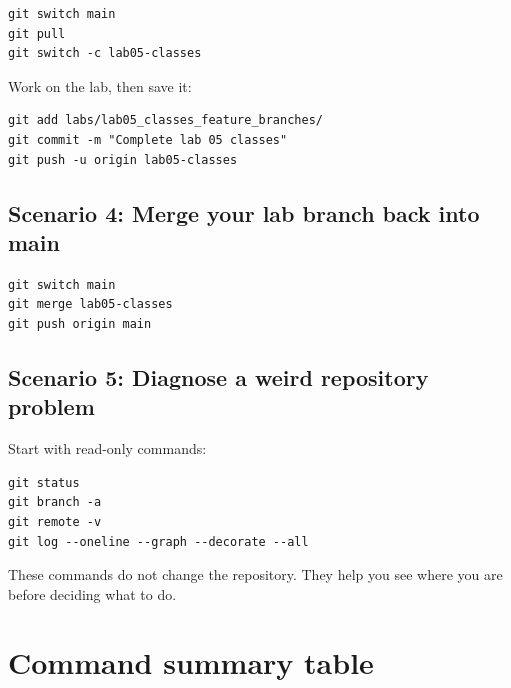 \documentclass[11pt]{article}
\begin{document}
\begin{lstlisting}[style=terminal]
git switch main
git pull
git switch -c lab05-classes
\end{lstlisting}

Work on the lab, then save it:

\begin{lstlisting}[style=terminal]
git add labs/lab05_classes_feature_branches/
git commit -m "Complete lab 05 classes"
git push -u origin lab05-classes
\end{lstlisting}

\subsection{Scenario 4: Merge your lab branch back into main}

\begin{lstlisting}[style=terminal]
git switch main
git merge lab05-classes
git push origin main
\end{lstlisting}

\subsection{Scenario 5: Diagnose a weird repository problem}
Start with read-only commands:

\begin{lstlisting}[style=terminal]
git status
git branch -a
git remote -v
git log --oneline --graph --decorate --all
\end{lstlisting}

These commands do not change the repository.  They help you see where you are before deciding what to do.

\section{Command summary table}
\end{document}
